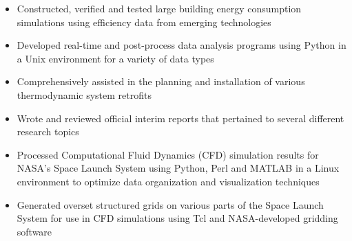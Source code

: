 \documentclass[10pt,letter,ragged2e]{altacv}
\begin{document}
\divider

\begin{itemize}
  \item Constructed, verified and tested large building energy consumption simulations using efficiency data from emerging technologies 
\end{itemize}

\begin{itemize}
  \item Developed real-time and post-process data analysis programs using Python in a Unix environment for a variety of data types
  \item Comprehensively assisted in the planning and installation of various thermodynamic system retrofits
  \item Wrote and reviewed official interim reports that pertained to several different research topics
\end{itemize}

\divider

\begin{itemize}
  \item Processed Computational Fluid Dynamics (CFD) simulation results for NASA's Space Launch System using Python, Perl and MATLAB in a Linux environment to optimize data organization and visualization techniques 
  \item Generated overset structured grids on various parts of the Space Launch System for use in CFD simulations using Tcl and NASA-developed gridding software
\end{itemize}

\clearpage

\nocite{*}
\end{document}
